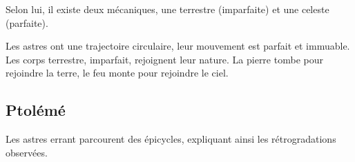 Selon lui, il existe deux mécaniques, une terrestre (imparfaite) et une celeste (parfaite).
\begin{center}
\setlength{\fboxsep}{3mm}
\end{center}
Les astres ont une trajectoire circulaire, leur mouvement est parfait et immuable.
Les corps terrestre, imparfait, rejoignent leur nature. La pierre tombe pour rejoindre la terre, le feu monte pour rejoindre le ciel.
%
\subsection{Ptolémé}
%
Les astres errant parcourent des épicycles, expliquant ainsi les rétrogradations observées.
%

